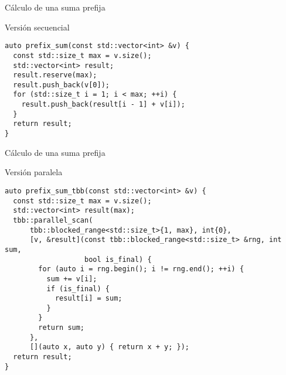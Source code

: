 \begin{frame}[t,fragile]{Cálculo de una suma prefija}
\begin{block}{Versión secuencial}
\begin{lstlisting}
auto prefix_sum(const std::vector<int> &v) {
  const std::size_t max = v.size();
  std::vector<int> result;
  result.reserve(max);
  result.push_back(v[0]);
  for (std::size_t i = 1; i < max; ++i) {
    result.push_back(result[i - 1] + v[i]);
  }
  return result;
}
\end{lstlisting}
\end{block}
\end{frame}

\begin{frame}[t,fragile]{Cálculo de una suma prefija}
\begin{block}{Versión paralela}
\begin{lstlisting}
auto prefix_sum_tbb(const std::vector<int> &v) {
  const std::size_t max = v.size();
  std::vector<int> result(max);
  tbb::parallel_scan(
      tbb::blocked_range<std::size_t>{1, max}, int{0},
      [v, &result](const tbb::blocked_range<std::size_t> &rng, int sum,
                   bool is_final) {
        for (auto i = rng.begin(); i != rng.end(); ++i) {
          sum += v[i];
          if (is_final) {
            result[i] = sum;
          }
        }
        return sum;
      },
      [](auto x, auto y) { return x + y; });
  return result;
}
\end{lstlisting}
\end{block}
\end{frame}
